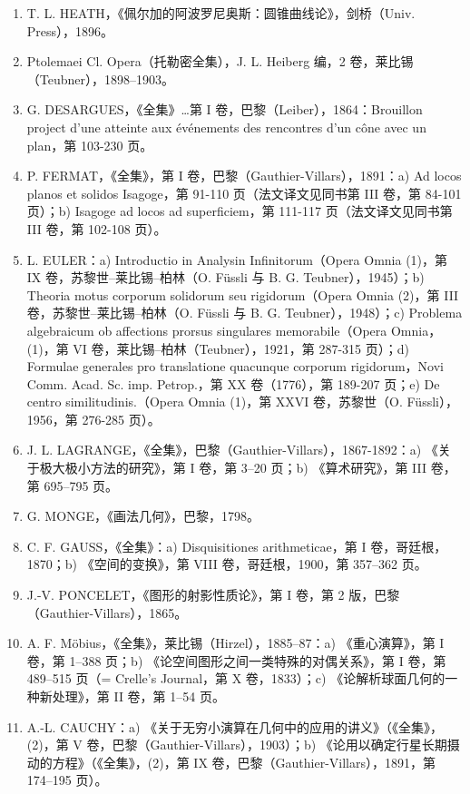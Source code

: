 \begin{enumerate}
\def\labelenumi{(\Roman{enumi})}
\setcounter{enumi}{3}
\item
  T. L. HEATH，《佩尔加的阿波罗尼奥斯：圆锥曲线论》，剑桥（Univ. Press），1896。
\item
  Ptolemaei Cl. Opera（托勒密全集），J. L. Heiberg 编，2 卷，莱比锡（Teubner），1898–1903。
\item
  G. DESARGUES，《全集》\ldots 第 I 卷，巴黎（Leiber），1864：Brouillon project d'une atteinte aux événements des rencontres d'un cône avec un plan，第 103-230 页。
\item
  P. FERMAT，《全集》，第 I 卷，巴黎（Gauthier-Villars），1891：a) Ad locos planos et solidos Isagoge，第 91-110 页（法文译文见同书第 III 卷，第 84-101 页）；b) Isagoge ad locos ad superficiem，第 111-117 页（法文译文见同书第 III 卷，第 102-108 页）。
\item
  L. EULER：a) Introductio in Analysin Infinitorum（Opera Omnia (1)，第 IX 卷，苏黎世–莱比锡–柏林（O. Füssli 与 B. G. Teubner），1945）；b) Theoria motus corporum solidorum seu rigidorum（Opera Omnia (2)，第 III 卷，苏黎世–莱比锡–柏林（O. Füssli 与 B. G. Teubner），1948）；c) Problema algebraicum ob affections prorsus singulares memorabile（Opera Omnia，(1)，第 VI 卷，莱比锡–柏林（Teubner），1921，第 287-315 页）；d) Formulae generales pro translatione quacunque corporum rigidorum，Novi Comm. Acad. Sc. imp. Petrop.，第 XX 卷（1776），第 189-207 页；e) De centro similitudinis.（Opera Omnia (1)，第 XXVI 卷，苏黎世（O. Füssli），1956，第 276-285 页）。
\item
  J. L. LAGRANGE，《全集》，巴黎（Gauthier-Villars），1867-1892：a) 《关于极大极小方法的研究》，第 I 卷，第 3–20 页；b) 《算术研究》，第 III 卷，第 695–795 页。
\item
  G. MONGE，《画法几何》，巴黎，1798。
\item
  C. F. GAUSS，《全集》：a) Disquisitiones arithmeticae，第 I 卷，哥廷根，1870；b) 《空间的变换》，第 VIII 卷，哥廷根，1900，第 357–362 页。
\item
  J.-V. PONCELET，《图形的射影性质论》，第 I 卷，第 2 版，巴黎（Gauthier-Villars），1865。
\item
  A. F. Möbius，《全集》，莱比锡（Hirzel），1885–87：a) 《重心演算》，第 I 卷，第 1–388 页；b) 《论空间图形之间一类特殊的对偶关系》，第 I 卷，第 489–515 页（= Crelle's Journal，第 X 卷，1833）；c) 《论解析球面几何的一种新处理》，第 II 卷，第 1–54 页。
\item
  A.-L. CAUCHY：a) 《关于无穷小演算在几何中的应用的讲义》（《全集》，(2)，第 V 卷，巴黎（Gauthier-Villars），1903）；b) 《论用以确定行星长期摄动的方程》（《全集》，(2)，第 IX 卷，巴黎（Gauthier-Villars），1891，第 174–195 页）。

\end{enumerate}
